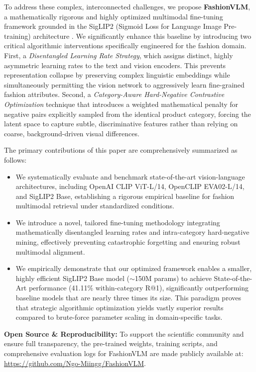 \documentclass[conference]{IEEEtran}
\begin{document}
To address these complex, interconnected challenges, we propose \textbf{FashionVLM}, a mathematically rigorous and highly optimized multimodal fine-tuning framework grounded in the SigLIP2 (Sigmoid Loss for Language Image Pre-training) architecture \cite{zhai2023sigmoid}. We significantly enhance this baseline by introducing two critical algorithmic interventions specifically engineered for the fashion domain. First, a \textit{Disentangled Learning Rate Strategy}, which assigns distinct, highly asymmetric learning rates to the text and vision encoders. This prevents representation collapse by preserving complex linguistic embeddings while simultaneously permitting the vision network to aggressively learn fine-grained fashion attributes. Second, a \textit{Category-Aware Hard-Negative Contrastive Optimization} technique that introduces a weighted mathematical penalty for negative pairs explicitly sampled from the identical product category, forcing the latent space to capture subtle, discriminative features rather than relying on coarse, background-driven visual differences.

The primary contributions of this paper are comprehensively summarized as follows:
\begin{itemize}
    \item We systematically evaluate and benchmark state-of-the-art vision-language architectures, including OpenAI CLIP ViT-L/14, OpenCLIP EVA02-L/14, and SigLIP2 Base, establishing a rigorous empirical baseline for fashion multimodal retrieval under standardized conditions.
    \item We introduce a novel, tailored fine-tuning methodology integrating mathematically disentangled learning rates and intra-category hard-negative mining, effectively preventing catastrophic forgetting and ensuring robust multimodal alignment.
    \item We empirically demonstrate that our optimized framework enables a smaller, highly efficient SigLIP2 Base model ($\sim$150M params) to achieve State-of-the-Art performance (41.11\% within-category R@1), significantly outperforming baseline models that are nearly three times its size. This paradigm proves that strategic algorithmic optimization yields vastly superior results compared to brute-force parameter scaling in domain-specific tasks.
\end{itemize}

\vspace{0.2cm}
\noindent \textbf{Open Source \& Reproducibility:} To support the scientific community and ensure full transparency, the pre-trained weights, training scripts, and comprehensive evaluation logs for FashionVLM are made publicly available at: \url{https://github.com/Ngo-Miingg/FashionVLM}.
\end{document}

